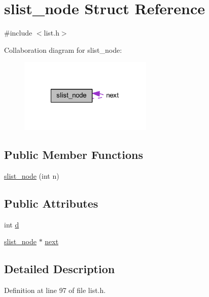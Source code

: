\hypertarget{structslist__node}{\section{slist\-\_\-node Struct Reference}
\label{structslist__node}
}


{\ttfamily \#include $<$list.\-h$>$}



Collaboration diagram for slist\-\_\-node\-:
\nopagebreak
\begin{figure}[H]
\begin{center}
\leavevmode
\includegraphics[width=180pt]{structslist__node__coll__graph}
\end{center}
\end{figure}
\subsection*{Public Member Functions}
\begin{DoxyCompactItemize}
\item 
\hyperlink{structslist__node_a07796f062d9bb5623c9ddaabcc46f009}{slist\-\_\-node} (int n)
\end{DoxyCompactItemize}
\subsection*{Public Attributes}
\begin{DoxyCompactItemize}
\item 
int \hyperlink{structslist__node_ad10237a1a1ad4ab70d89ad399e367cdc}{d}
\item 
\hyperlink{structslist__node}{slist\-\_\-node} $\ast$ \hyperlink{structslist__node_aee1e76b0000738d1bfda734232801359}{next}
\end{DoxyCompactItemize}


\subsection{Detailed Description}


Definition at line 97 of file list.\-h.



